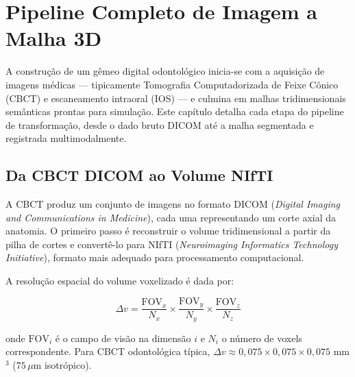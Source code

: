 
\section{Pipeline Completo de Imagem a Malha 3D}
\label{sec:pipeline-imagem-malha}

A construção de um gêmeo digital odontológico inicia-se com a aquisição de imagens médicas — tipicamente Tomografia Computadorizada de Feixe Cônico (CBCT) e escaneamento intraoral (IOS) — e culmina em malhas tridimensionais semânticas prontas para simulação. Este capítulo detalha cada etapa do pipeline de transformação, desde o dado bruto DICOM até a malha segmentada e registrada multimodalmente.

\subsection{Da CBCT DICOM ao Volume NIfTI}
\label{subsec:cbct-nifti}

A CBCT produz um conjunto de imagens no formato DICOM (\textit{Digital Imaging and Communications in Medicine}), cada uma representando um corte axial da anatomia. O primeiro passo é reconstruir o volume tridimensional a partir da pilha de cortes e convertê-lo para NIfTI (\textit{Neuroimaging Informatics Technology Initiative}), formato mais adequado para processamento computacional.

A resolução espacial do volume voxelizado é dada por:

\begin{equation}
\label{eq:resolucao-voxel}
\Delta v = \frac{\text{FOV}_x}{N_x} \times \frac{\text{FOV}_y}{N_y} \times \frac{\text{FOV}_z}{N_z}
\end{equation}

onde $\text{FOV}_i$ é o campo de visão na dimensão $i$ e $N_i$ o número de voxels correspondente. Para CBCT odontológica típica, $\Delta v \approx 0,075 \times 0,075 \times 0,075$ mm$^3$ ($75\,\mu$m isotrópico).

